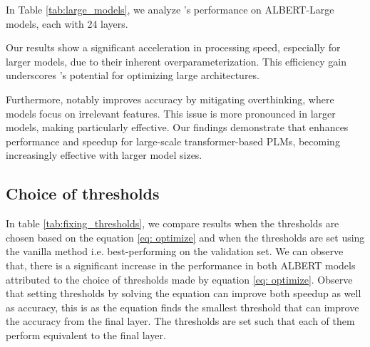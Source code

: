 In Table \ref{tab:large_models}, we analyze \algo{}'s performance on ALBERT-Large models, each with 24 layers.

Our results show a significant acceleration in processing speed, especially for larger models, due to their inherent overparameterization. This efficiency gain underscores \algo{}'s potential for optimizing large architectures.

Furthermore, \algo{} notably improves accuracy by mitigating overthinking, where models focus on irrelevant features. This issue is more pronounced in larger models, making \algo{} particularly effective. Our findings demonstrate that \algo{} enhances performance and speedup for large-scale transformer-based PLMs, becoming increasingly effective with larger model sizes.








\subsection{Choice of thresholds}
In table \ref{tab:fixing_thresholds}, we compare results when the thresholds are chosen based on the equation \ref{eq: optimize} and when the thresholds are set using the vanilla method i.e. best-performing on the validation set. We can observe that, there is a significant increase in the performance in both ALBERT models attributed to the choice of thresholds made by equation \ref{eq: optimize}. Observe that setting thresholds by solving the equation can improve both speedup as well as accuracy, this is as the equation finds the smallest threshold that can improve the accuracy from the final layer. The thresholds are set such that each of them perform equivalent to the final layer.





